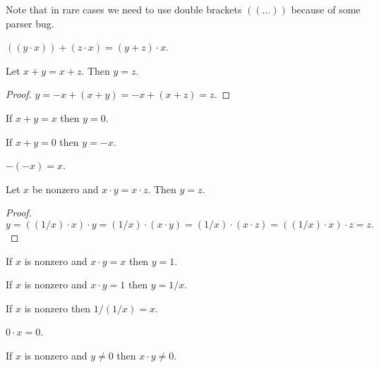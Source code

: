 \documentclass{article}
\begin{document}
Note that in rare cases we need to use double brackets 
$((\dots))$ because
of some parser bug.
\begin{forthel}
\begin{proposition}
$((y \cdot x)) + (z \cdot x) = (y + z) \cdot x$.
\end{proposition}

\begin{proposition}
Let $x + y = x + z$. Then $y = z$.
\end{proposition}
\begin{proof}
$y = -x + (x+y) = -x + (x+z) = z$.
\end{proof}

\begin{proposition}
If $x + y = x$ then $y = 0$.
\end{proposition}

\begin{proposition}
If $x + y = 0$ then $y = -x$.
\end{proposition}

\begin{proposition}
$-(-x) = x$.
\end{proposition}


\begin{proposition}
Let $x$ be nonzero and $x \cdot y = x \cdot z$.
Then $y = z$.
\end{proposition}
\begin{proof}
$ y = ((1/x) \cdot x) \cdot y = (1/x) \cdot (x \cdot y) =
(1/x) \cdot (x \cdot z) = ((1/x) \cdot x) \cdot z = z.$
\end{proof}

\begin{proposition}
If $x$ is nonzero and $x \cdot y = x$ then $y = 1$.
\end{proposition}

\begin{proposition}
If $x$ is nonzero and $x \cdot y = 1$ then $y = 1/x$.
\end{proposition}

\begin{proposition}
If $x$ is nonzero then $1/(1/x) = x$.
\end{proposition}

\begin{proposition}
$0 \cdot x = 0$.
\end{proposition}

\begin{proposition}
If $x$ is nonzero and $y \neq 0$ then $x \cdot y \neq 0$.
\end{proposition}


\end{forthel}
\end{document}
